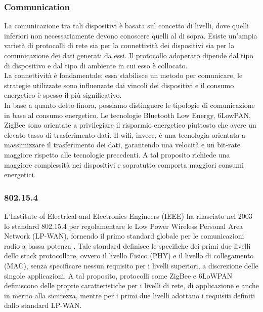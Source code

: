 \subsubsection{Communication}
La comunicazione tra tali dispositivi è basata sul concetto di livelli, dove quelli inferiori non necessariamente devono conoscere quelli al di sopra. Esiste un'ampia varietà di protocolli di rete sia per la connettività dei dispositivi sia per la comunicazione dei dati generati da essi. Il protocollo adoperato dipende dal tipo di dispositivo e dal tipo di ambiente in cui esso è collocato.\\
La connettività è fondamentale: essa stabilisce un metodo per comunicare, le strategie utilizzate sono influenzate dai vincoli dei dispositivi e il consumo energetico è spesso il più significativo.\\

\noindent In base a quanto detto finora, possiamo distinguere le tipologie di comunicazione in base al consumo energetico. Le tecnologie Bluetooth Low Energy, 6LowPAN, ZigBee sono orientate a privilegiare il risparmio energetico piuttosto che avere un elevato tasso di trasferimento dati. Il wifi, invece, è una tecnologia orientata a massimizzare il trasferimento dei dati, garantendo una velocità e un bit-rate maggiore rispetto alle tecnologie precedenti. A tal proposito richiede una maggiore complessità nei dispositivi e sopratutto comporta maggiori consumi energetici.

\subsubsection{802.15.4}
L'Institute of Electrical and Electronics Engineers (IEEE) ha rilasciato nel 2003 lo standard 802.15.4 per regolamentare le Low Power Wireless Personal Area Network (LP-WAN), fornendo il primo standard globale per le comunicazioni radio a bassa potenza  \cite{callaway2002home}.
Tale standard definisce le specifiche dei primi due livelli dello stack protocollare, ovvero il livello Fisico (PHY) e il livello di collegamento (MAC), senza specificare nessun requisito per i livelli superiori, a discrezione delle singole applicazioni.
A tal proposito, protocolli come ZigBee e 6LoWPAN definiscono delle proprie caratteristiche per i livelli di rete, di applicazione e anche in merito alla sicurezza, mentre per i primi due livelli adottano i requisiti definiti dallo standard LP-WAN.\\

